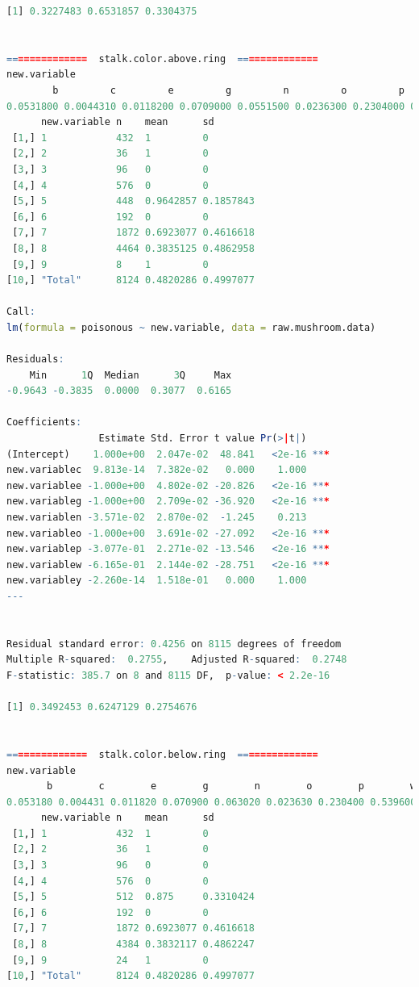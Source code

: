 \documentclass[12pt]{article}
\begin{document}
\begin{lstlisting}[language = R]
[1] 0.3227483 0.6531857 0.3304375


==============  stalk.color.above.ring  ==============
new.variable
        b         c         e         g         n         o         p         w         y      <NA> 
0.0531800 0.0044310 0.0118200 0.0709000 0.0551500 0.0236300 0.2304000 0.5495000 0.0009847 0.0000000 
      new.variable n    mean      sd       
 [1,] 1            432  1         0        
 [2,] 2            36   1         0        
 [3,] 3            96   0         0        
 [4,] 4            576  0         0        
 [5,] 5            448  0.9642857 0.1857843
 [6,] 6            192  0         0        
 [7,] 7            1872 0.6923077 0.4616618
 [8,] 8            4464 0.3835125 0.4862958
 [9,] 9            8    1         0        
[10,] "Total"      8124 0.4820286 0.4997077

Call:
lm(formula = poisonous ~ new.variable, data = raw.mushroom.data)

Residuals:
    Min      1Q  Median      3Q     Max 
-0.9643 -0.3835  0.0000  0.3077  0.6165 

Coefficients:
                Estimate Std. Error t value Pr(>|t|)    
(Intercept)    1.000e+00  2.047e-02  48.841   <2e-16 ***
new.variablec  9.813e-14  7.382e-02   0.000    1.000    
new.variablee -1.000e+00  4.802e-02 -20.826   <2e-16 ***
new.variableg -1.000e+00  2.709e-02 -36.920   <2e-16 ***
new.variablen -3.571e-02  2.870e-02  -1.245    0.213    
new.variableo -1.000e+00  3.691e-02 -27.092   <2e-16 ***
new.variablep -3.077e-01  2.271e-02 -13.546   <2e-16 ***
new.variablew -6.165e-01  2.144e-02 -28.751   <2e-16 ***
new.variabley -2.260e-14  1.518e-01   0.000    1.000    
---


Residual standard error: 0.4256 on 8115 degrees of freedom
Multiple R-squared:  0.2755,	Adjusted R-squared:  0.2748 
F-statistic: 385.7 on 8 and 8115 DF,  p-value: < 2.2e-16

[1] 0.3492453 0.6247129 0.2754676


==============  stalk.color.below.ring  ==============
new.variable
       b        c        e        g        n        o        p        w        y     <NA> 
0.053180 0.004431 0.011820 0.070900 0.063020 0.023630 0.230400 0.539600 0.002954 0.000000 
      new.variable n    mean      sd       
 [1,] 1            432  1         0        
 [2,] 2            36   1         0        
 [3,] 3            96   0         0        
 [4,] 4            576  0         0        
 [5,] 5            512  0.875     0.3310424
 [6,] 6            192  0         0        
 [7,] 7            1872 0.6923077 0.4616618
 [8,] 8            4384 0.3832117 0.4862247
 [9,] 9            24   1         0        
[10,] "Total"      8124 0.4820286 0.4997077


\end{lstlisting}
\end{document}
